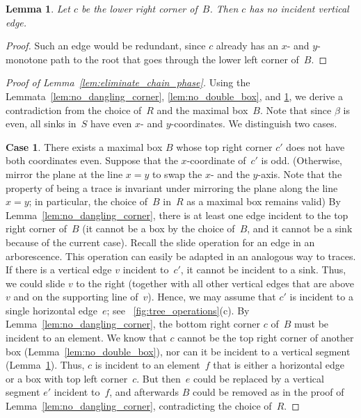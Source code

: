 \documentclass[a4paper,11pt]{article}
\newtheorem{lemma}[theorem]{Lemma}
\newcommand{\qedopt}{}
\begin{document}
\begin{lemma}\label{lem:no_vertical_edge}
Let $c$ be the lower right corner of~$B$.
Then $c$ has no incident vertical edge.
\end{lemma}
\begin{proof}
Such an edge would be redundant, since $c$ already has an $x$- and $y$-monotone path to the root that goes through the lower left corner of~$B$.
\qedopt
\end{proof}

\begin{proof}[Proof of Lemma~\ref{lem:eliminate_chain_phase}]
Using the Lemmata~\ref{lem:no_dangling_corner}, \ref{lem:no_double_box}, and \ref{lem:no_vertical_edge}, we derive a contradiction from the choice of~$R$ and the maximal box~$B$.
Note that since $\beta$ is even, all sinks in~$S$ have even $x$- and $y$-coordinates.
We distinguish two cases.

\noindent\textbf{Case 1}.
There exists a maximal box $B$ whose top right corner $c'$ does 
not have both coordinates even.
Suppose that the $x$-coordinate of~$c'$ is odd. (Otherwise, 
mirror the plane at the line $x=y$ to swap the $x$- and the $y$-axis.
Note that the property of being a trace is invariant under mirroring 
the plane along the line $x = y$;
in particular, the choice of~$B$ in~$R$ as a maximal box remains valid)
By Lemma~\ref{lem:no_dangling_corner},
there is at least one edge incident to the top right corner of~$B$ 
(it cannot be a box by the choice of~$B$, and it cannot be a sink 
because of the current case). 
Recall the slide operation for an edge in an arborescence. This operation 
can easily be adapted in an analogous way to traces.
If there is a vertical edge $v$ incident to~$c'$, it cannot be incident
to a sink. Thus, we could slide $v$ 
to the right (together with all other 
vertical edges that are above $v$ and on the supporting line of~$v$).
Hence, we may assume that $c'$ is incident to a single horizontal edge~$e$;
see \figurename~\ref{fig:tree_operations}(c).
By Lemma~\ref{lem:no_dangling_corner}, the bottom right corner $c$ 
of~$B$ must be incident to an element.
We know that $c$ cannot be the top right corner of another box 
(Lemma~\ref{lem:no_double_box}), nor can it be incident to a vertical
segment (Lemma~\ref{lem:no_vertical_edge}). Thus, $c$ is incident to
an element~$f$ that is either a horizontal edge or a box with top left corner~$c$.
But then~$e$ could be replaced by a vertical segment $e'$ incident to~$f$,
and afterwards  $B$ could be removed as in the proof of
Lemma~\ref{lem:no_dangling_corner}, contradicting the choice of~$R$.


\end{proof}
\end{document}
